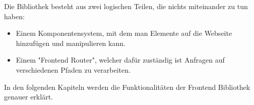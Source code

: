 Die Bibliothek besteht aus zwei logischen Teilen, die nichts miteinander zu tun haben:
\begin{itemize}
    \item Einem Komponentensystem, mit dem man Elemente auf die Webseite hinzufügen und manipulieren kann. 
    \item Einem "Frontend Router", welcher dafür zuständig ist Anfragen auf verschiedenen Pfaden zu verarbeiten.
\end{itemize}

In den folgenden Kapiteln werden die Funktionalitäten der Frontend Bibliothek genauer erklärt.